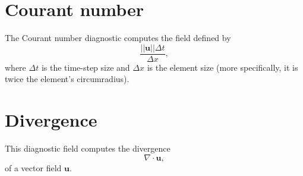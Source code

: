 \documentclass[a4paper,11pt]{report}
\begin{document}
\section{Courant number}
The Courant number diagnostic computes the field defined by
\begin{equation}
   \frac{||\mathbf{u}||\Delta t}{\Delta x},
\end{equation}
where $\Delta t$ is the time-step size and $\Delta x$ is the element size (more specifically, it is twice the element's circumradius).

\section{Divergence}
This diagnostic field computes the divergence
\begin{equation}
   \nabla\cdot\mathbf{u},
\end{equation}
of a vector field $\mathbf{u}$.



\end{document}
